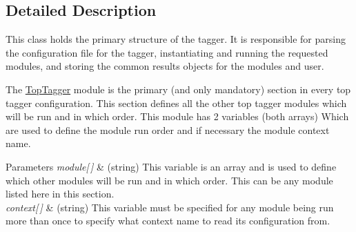 \subsection{Detailed Description}
This class holds the primary structure of the tagger. It is responsible for parsing the configuration file for the tagger, instantiating and running the requested modules, and storing the common results objects for the modules and user.

The \hyperlink{classTopTagger}{Top\-Tagger} module is the primary (and only mandatory) section in every top tagger configuration. This section defines all the other top tagger modules which will be run and in which order. This module has 2 variables (both arrays) Which are used to define the module run order and if necessary the module context name. 
\begin{DoxyParams}{Parameters}
{\em module\mbox{[}$\,$\mbox{]}} & (string) This variable is an array and is used to define which other modules will be run and in which order. This can be any module listed here in this section. \\
\hline
{\em context\mbox{[}$\,$\mbox{]}} & (string) This variable must be specified for any module being run more than once to specify what context name to read its configuration from. \\
\hline
\end{DoxyParams}


